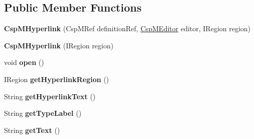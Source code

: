 \subsection*{Public Member Functions}
\begin{DoxyCompactItemize}
\item 
\mbox{\label{classcom_1_1fware_1_1cspdt_1_1cspm_1_1editor_1_1link_1_1_csp_m_hyperlink_a9cf5966937aff9e9321d10fe396cf036}} 
{\bfseries Csp\+M\+Hyperlink} (Csp\+M\+Ref definition\+Ref, \hyperlink{classcom_1_1fware_1_1cspdt_1_1cspm_1_1editor_1_1_csp_m_editor}{Csp\+M\+Editor} editor, I\+Region region)
\item 
\mbox{\label{classcom_1_1fware_1_1cspdt_1_1cspm_1_1editor_1_1link_1_1_csp_m_hyperlink_aff308ee648cd8aaef48eeb3a9eef0fe1}} 
{\bfseries Csp\+M\+Hyperlink} (I\+Region region)
\item 
\mbox{\label{classcom_1_1fware_1_1cspdt_1_1cspm_1_1editor_1_1link_1_1_csp_m_hyperlink_a59d9df485adaca9eb40042c791bca9f0}} 
void {\bfseries open} ()
\item 
\mbox{\label{classcom_1_1fware_1_1cspdt_1_1cspm_1_1editor_1_1link_1_1_csp_m_hyperlink_abc0605be767a7be07858f0341d2c8ff0}} 
I\+Region {\bfseries get\+Hyperlink\+Region} ()
\item 
\mbox{\label{classcom_1_1fware_1_1cspdt_1_1cspm_1_1editor_1_1link_1_1_csp_m_hyperlink_aa9c9494c61d7f4a1c58d315347df3d7d}} 
String {\bfseries get\+Hyperlink\+Text} ()
\item 
\mbox{\label{classcom_1_1fware_1_1cspdt_1_1cspm_1_1editor_1_1link_1_1_csp_m_hyperlink_a230dfd89f2862a940f5669eac6b99ae5}} 
String {\bfseries get\+Type\+Label} ()
\item 
\mbox{\label{classcom_1_1fware_1_1cspdt_1_1cspm_1_1editor_1_1link_1_1_csp_m_hyperlink_ae0f2095da50b6b69c3e190e08de34bac}} 
String {\bfseries get\+Text} ()
\end{DoxyCompactItemize}


